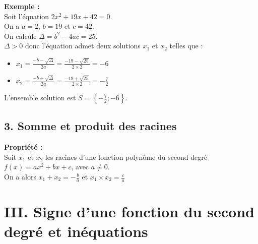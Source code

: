 \documentclass[11pt,a4paper]{article}
\begin{document}
\textbf{Exemple :} \\
Soit l'équation $2x^2+19x+42=0$. \\

On a $a=2$, $b=19$ et $c=42$. \\
On calcule $\Delta=b^2-4ac=25$. \\
$\Delta>0$ donc l'équation admet deux solutions $x_1$ et $x_2$ telles que :
\vspace{-6pt}
\begin{itemize}
	\item $x_1=\frac{-b-\sqrt{\Delta}}{2a}=\frac{-19-\sqrt{25}}{2\times2}=-6$ 
	\item $x_2=\frac{-b+\sqrt{\Delta}}{2a}=\frac{-19+\sqrt{25}}{2\times2}=-\frac{7}{2}$ 
\end{itemize}

L'ensemble solution est $S=\left\{-\frac{7}{2};-6\right\}$. 

\subsection*{3. Somme et produit des racines}

\begin{mdframed}[style=proprieteStyle]
	\textbf{Propriété :} ~\\
	Soit $x_1$ et $x_2$ les racines d'une fonction polynôme du second degré $f(x)=ax^2+bx+c$, avec $a\not=0$. \\
	On a alors $x_1+x_2=-\frac{b}{a}$ et $x_1\times x_2=\frac{c}{a}$
\end{mdframed}

\newpage

\section*{III. Signe d'une fonction du second degré et inéquations}
\end{document}
